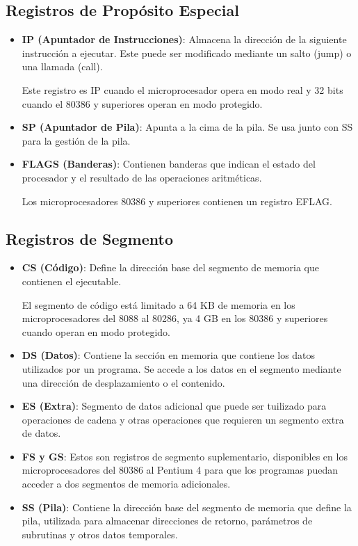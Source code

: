 	\subsection{Registros de Propósito Especial}

	\begin{itemize}
		\item \textbf{IP (Apuntador de Instrucciones)}: Almacena la dirección de la siguiente
			instrucción a ejecutar. Este puede ser modificado mediante un salto (jump) o
			una llamada (call).

			Este registro es IP cuando el microprocesador opera en modo real y 32 bits
			cuando el 80386 y superiores operan en modo protegido.

		\item \textbf{SP (Apuntador de Pila)}: Apunta a la cima de la pila. Se usa junto
			con SS para la gestión de la pila.

		\item \textbf{FLAGS (Banderas)}: Contienen banderas que indican el estado del procesador
			y el resultado de las operaciones aritméticas.

			Los microprocesadores 80386 y superiores contienen un registro EFLAG.
	\end{itemize}

	\subsection{Registros de Segmento}

	\begin{itemize}
		\item \textbf{CS (Código)}: Define la dirección base del segmento de memoria que contienen
			el ejecutable.

			El segmento de código está limitado a 64 KB de memoria en los microprocesadores
			del 8088 al 80286, ya 4 GB en los 80386 y superiores cuando operan en modo
			protegido.

		\item \textbf{DS (Datos)}: Contiene la sección en memoria que contiene los datos utilizados
			por un programa. Se accede a los datos en el segmento mediante una dirección
			de desplazamiento o el contenido.

		\item \textbf{ES (Extra)}: Segmento de datos adicional que puede ser tuilizado para
			operaciones de cadena y otras operaciones que requieren un segmento extra de datos.

		\item \textbf{FS y GS}: Estos son registros de segmento suplementario, disponibles
			en los microprocesadores del 80386 al Pentium 4 para que los programas puedan
			acceder a dos segmentos de memoria adicionales.

		\item \textbf{SS (Pila)}: Contiene la dirección base del segmento de memoria que define
			la pila, utilizada para almacenar direcciones de retorno, parámetros de subrutinas
			y otros datos temporales.
	\end{itemize}

